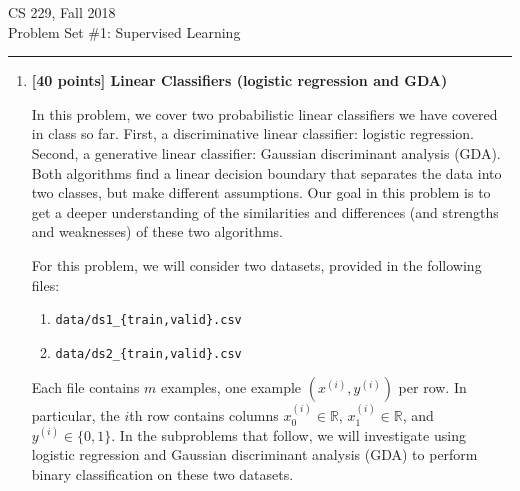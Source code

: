 \documentclass[10pt]{article}
\begin{document}

{\Large CS 229, Fall 2018}\\[-1pt]
{\LARGE Problem Set \#1: Supervised Learning}

\vspace{0.6em}
\hrule
\vspace{0.8em}

\begin{enumerate}


\item \textbf{[40 points] Linear Classifiers (logistic regression and GDA)}

In this problem, we cover two probabilistic linear classifiers we have
covered in class so far. First, a discriminative linear classifier:
logistic regression. Second, a generative linear classifier: Gaussian
discriminant analysis (GDA). Both algorithms find a linear decision
boundary that separates the data into two classes, but make different
assumptions. Our goal in this problem is to get a deeper understanding
of the similarities and differences (and strengths and weaknesses) of
these two algorithms.

For this problem, we will consider two datasets, provided in the
following files:
\begin{enumerate}[label=\roman*.]
    \item \texttt{data/ds1\_\{train,valid\}.csv}
    \item \texttt{data/ds2\_\{train,valid\}.csv}
\end{enumerate}

Each file contains $m$ examples, one example
$(x^{(i)},y^{(i)})$ per row. In particular, the $i$th row contains
columns $x_0^{(i)}\in\mathbb{R}$,
$x_1^{(i)}\in\mathbb{R}$, and $y^{(i)}\in\{0,1\}$.
In the subproblems that follow, we will investigate using logistic
regression and Gaussian discriminant analysis (GDA) to perform binary
classification on these two datasets.

\begin{enumerate}[label=(\alph*)]



\end{enumerate}
\end{enumerate}
\end{document}
